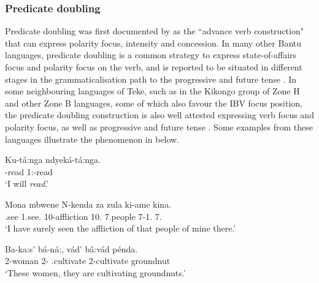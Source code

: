 \documentclass[output=paper,colorlinks,citecolor=brown,
]{langscibook}
\begin{document}
\subsubsection{Predicate doubling}\label{teke:sec:3.2.2}
Predicate doubling was first documented by \citet[121]{Meeussen1967} as the ``advance verb construction" that can express polarity focus, intensity and concession. In many other Bantu languages, predicate doubling is a common strategy to express state-of-affairs focus and polarity focus on the verb, and is reported to be situated in different stages in the grammaticalisation path to the progressive and future tense \citep{GüldemannEtAl2010, GüldemannEtAl2014, Morimoto2016}. In some neighbouring languages of Teke, such as in the Kikongo group of Zone H and other Zone B languages, some of which also favour the IBV focus position, the predicate doubling construction is also well attested expressing verb focus and polarity focus, as well as progressive and future tense \citep{Hadermann1996, DeKind2014, DeKindEtAl2015, GüldemannFiedler2022}. Some examples from these languages illustrate the phenomenon in  below. 
\begin{exe}
\ex
\label{52}
\gll
Ku-tá:nga ndyeká-tá:nga.\\
\Inf{}-read 1\Sg{}:\Fut{}-read\\
\trans ‘I will \textit{read}.’     

\end{exe}
\begin{exe}
\ex
\label{53}
\gll
Mona mbwene N-kenda za zula ki-ame kina.\\
\Inf{}.see 1\Sg{}.see.\Perf{} 10-affliction 10.\Gen{} 7.people 7-1\Sg{}.\Poss{} 7.\Dem{}\\
\trans ‘I have surely seen the affliction of that people of mine there.’     

\end{exe}
\begin{exe}
\ex
\label{54}
\gll
Ba-ka:s\'{\textschwa} bá-ná:, vád\'{\textschwa} b\^{a}:vád{\textschwa} pénda.\\
2-woman 2-\Dem{} \Inf{}.cultivate 2-cultivate groundnut\\
\trans ‘These women, they are cultivating groundnuts.’     

\end{exe}
\end{document}
